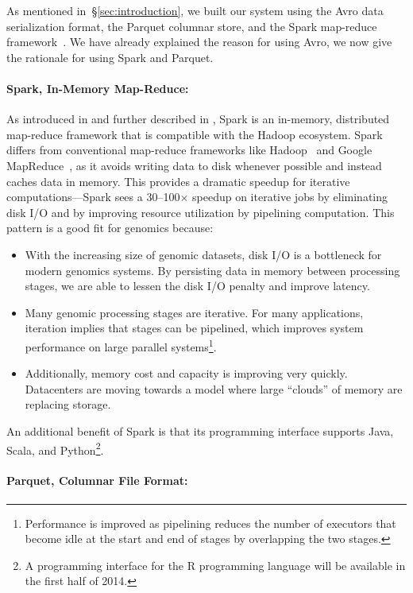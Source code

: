 \documentclass{bioinfo}
\begin{document}
As mentioned in~\S\ref{sec:introduction}, we built our system using the Avro data serialization format, the Parquet columnar store, and the Spark map-reduce
framework~\citep{avro, parquet, zaharia10}. We have already explained the reason for using Avro, we now give the rationale for using Spark and Parquet.

\paragraph{Spark, In-Memory Map-Reduce:}
\label{sec:spark}

As introduced in \citet{zaharia10} and further described in \citet{zaharia12}, Spark is an in-memory, distributed map-reduce framework that is
compatible with the Hadoop ecosystem. Spark differs from conventional map-reduce frameworks
like Hadoop~\citep{hadoop} and Google MapReduce~\citep{dean08}, as it avoids writing data to disk whenever possible and instead caches
data in memory. This provides a dramatic speedup for iterative computations---Spark sees a 30--100$\times$ speedup on iterative jobs by eliminating
disk I/O and by improving resource utilization by pipelining computation. This pattern is a good fit for genomics because:

\begin{itemize}
\item With the increasing size of genomic datasets, disk I/O is a bottleneck for modern genomics systems. By persisting data in memory between processing stages,
we are able to lessen the disk I/O penalty and improve latency.
\item Many genomic processing stages are iterative. For many applications, iteration implies that stages can be pipelined, which improves system performance on large
parallel systems\footnote{Performance is improved as pipelining reduces the number of executors that become idle at the start and end of stages by overlapping the
two stages.}.
\item Additionally, memory cost and capacity is improving very quickly. Datacenters are moving towards a model where large ``clouds'' of memory are replacing storage.
\end{itemize}

An additional benefit of Spark is that its programming interface supports Java, Scala, and Python\footnote{A programming interface for the R programming language will
be available in the first half of 2014.}.

\paragraph{Parquet, Columnar File Format:}
\label{sec:parquet}
\end{document}
